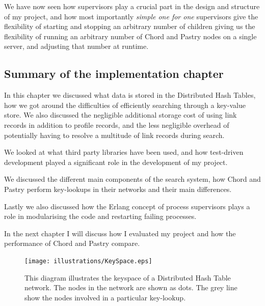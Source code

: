 \mbox{}

We have now seen how supervisors play a crucial part in the design and structure of my project, and how most importantly \emph{simple one for one} supervisors give the flexibility of starting and stopping an arbitrary number of children giving us the flexibility of running an arbitrary number of Chord and Pastry nodes on a single server, and adjusting that number at runtime.

\subsection{Summary of the implementation chapter}
In this chapter we discussed what data is stored in the Distributed Hash Tables, how we got around the difficulties of efficiently searching through a key-value store. We also discussed the negligible additional storage cost of using link records in addition to profile records, and the less negligible overhead of potentially having to resolve a multitude of link records during search.

We looked at what third party libraries have been used, and how test-driven development played a significant role in the development of my project.

We discussed the different main components of the search system, how Chord and Pastry perform key-lookups in their networks and their main differences.

Lastly we also discussed how the Erlang concept of process supervisors plays a role in modularising the code and restarting failing processes.

In the next chapter I will discuss how I evaluated my project and how the performance of Chord and Pastry compare.

\begin{figure}[!htb]
\begin{center}
	\texttt{[image: illustrations/KeySpace.eps]}
\caption{This diagram illustrates the keyspace of a Distributed Hash Table network. The nodes in the network are shown as dots. The grey line show the nodes involved in a particular key-lookup.}
\label{keySpace}
\end{center}
\end{figure}
